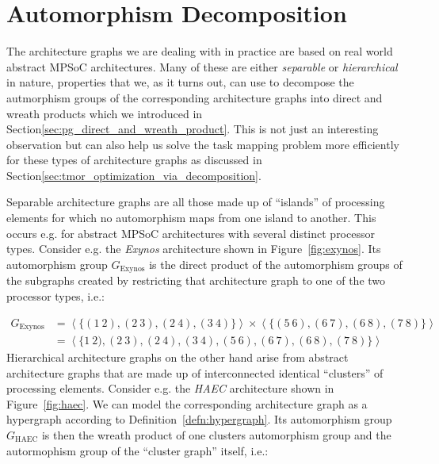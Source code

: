 \section{Automorphism Decomposition}
\label{sec:ag_automorphism_decomposition}

The architecture graphs we are dealing with in practice are based on real world
abstract MPSoC architectures. Many of these are either \textit{separable} or
\textit{hierarchical} in nature, properties that we, as it turns out, can use
to decompose the autmorphism groups of the corresponding architecture graphs
into direct and wreath products which we introduced in
Section\ref{sec:pg_direct_and_wreath_product}. This is not just an
interesting observation but can also help us solve the task mapping problem
more efficiently for these types of architecture graphs as discussed in
Section\ref{sec:tmor_optimization_via_decomposition}.

Separable architecture graphs are all those made up of ``islands'' of
processing elements for which no automorphism maps from one island to another.
This occurs e.g. for abstract MPSoC architectures with several distinct
processor types. Consider e.g. the \textit{Exynos} architecture shown in
Figure~\ref{fig:exynos}. Its automorphism group $G_{\mathrm{Exynos}}$
is the direct product of the automorphism groups of the subgraphs created by
restricting that architecture graph to one of the two processor types, i.e.:

\begin{align*}
  G_{\mathrm{Exynos}} &=
      \left<\{(1\ 2), (2\ 3), (2\ 4), (3\ 4)\}\right>
        \times
      \left<\{(5\ 6), (6\ 7), (6\ 8), (7\ 8)\}\right> \\
    &= \left<\{1\ 2), (2\ 3), (2\ 4), (3\ 4), (5\ 6), (6\ 7), (6\ 8), (7\ 8)\}\right>
\end{align*}
%
Hierarchical architecture graphs on the other hand arise from abstract
architecture graphs that are made up of interconnected identical ``clusters''
of processing elements. Consider e.g. the \textit{HAEC} architecture shown in
Figure~\ref{fig:haec}. We can model the corresponding architecture graph as a
hypergraph according to Definition~\ref{defn:hypergraph}. Its automorphism
group $G_{\mathrm{HAEC}}$ is then the wreath product of one clusters automorphism group and the
autormophism group of the ``cluster graph'' itself, i.e.:

